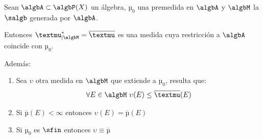 \documentclass{apuntes}
\begin{document}
\begin{theorem}
Sean $\algbA \subset \algbP(X)$ un álgebra, $µ_0$ una premedida en $\algbA$ y $\algbM$ la $\salgb$ generada por $\algbA$.

Entonces $µ^*_{|\algbM}=\overline{µ}$ es una medida cuya restricción a $\algbA$ coincide con $µ_0$.

Además:
\begin{enumerate}
\item Sea $\upsilon$ otra medida en $\algbM$ que extiende a $µ_0$, resulta que:
\[\forall E \in \algbM \ \upsilon(E) \leq \overline{µ}(E)\]
\item Si $\overline{µ}(E) < \infty$ entonces $\upsilon(E) = \overline{µ}(E)$
\item Si $µ_0$ es $\sfin$ entonces $\upsilon \equiv \overline{µ}$
\end{enumerate}
\end{theorem}
\end{document}
